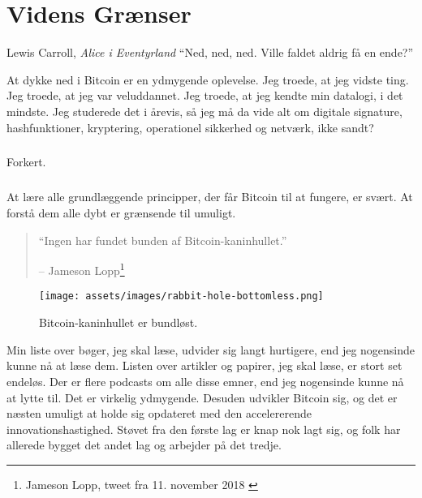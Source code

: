 \chapter{Videns Grænser}
\label{les:7}

\begin{chapquote}{Lewis Carroll, \textit{Alice i Eventyrland}}
\enquote{Ned, ned, ned. Ville faldet aldrig få en ende?}
\end{chapquote}

At dykke ned i Bitcoin er en ydmygende oplevelse. Jeg troede, at jeg vidste 
ting. Jeg troede, at jeg var veluddannet. Jeg troede, at jeg kendte min 
datalogi, i det mindste. Jeg studerede det i årevis, så jeg må da vide alt om 
digitale signature, hashfunktioner, kryptering, operationel sikkerhed og 
netværk, ikke sandt?

\paragraph{}
Forkert.

\paragraph{}
At lære alle grundlæggende principper, der får Bitcoin til at fungere, er 
svært. At forstå dem alle dybt er grænsende til umuligt.

\begin{quotation}\begin{samepage}
\enquote{Ingen har fundet bunden af Bitcoin-kaninhullet.}
\begin{flushright} -- Jameson Lopp\footnote{Jameson Lopp, tweet fra 11.
    november 2018 \cite{lopp-tweet}}
\end{flushright}\end{samepage}\end{quotation}

\begin{figure}[htbp]
    \centering
    \texttt{[image: assets/images/rabbit-hole-bottomless.png]}
    \caption{Bitcoin-kaninhullet er bundløst.}
    \label{fig:rabbit-hole-bottomless}
\end{figure}

Min liste over bøger, jeg skal læse, udvider sig langt hurtigere, end jeg 
nogensinde kunne nå at læse dem. Listen over artikler og papirer, jeg skal 
læse, er stort set endeløs. Der er flere podcasts om alle disse emner, end 
jeg nogensinde kunne nå at lytte til. Det er virkelig ydmygende. Desuden 
udvikler Bitcoin sig, og det er næsten umuligt at holde sig opdateret med den 
accelererende innovationshastighed. Støvet fra den første lag er knap nok lagt 
sig, og folk har allerede bygget det andet lag og arbejder på det tredje.


